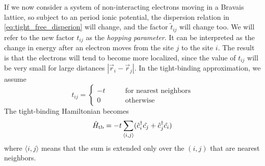 If we now consider a system of non-interacting electrons moving in a Bravais lattice, so subject to an period ionic potential, the dispersion relation in \cref{eq:tight_free_disperion} will change, and the factor $\tilde{t}_{ij}$ will change too. We will refer to the new factor $t_{ij}$ as the \emph{hopping parameter}. It can be interpreted as the change in energy after an electron moves from the site $j$ to the site $i$. The result is that the electrons will tend to become more localized, since the value of $t_{ij}$ will be very small for large distances $|\vec{r}_i - \vec{r}_j|$. In the tight-binding approximation, we assume
\begin{equation}
    t_{ij} =
    \begin{cases}
        -t \qquad                                     & \text{for nearest neighbors} \\
        0                                      \qquad & \text{otherwise}
    \end{cases}
\end{equation}
The tight-binding Hamiltonian becomes
\begin{equation} \label{eq:tight_hamiltonian_position}
    \hat{H}_\text{tb} = -t \sum_{\langle i,j \rangle} (\hat{c}^\dagger_i\hat{c_j} +  \hat{c}^\dagger_j\hat{c_i})
\end{equation}
where ${\langle i,j \rangle}$ means that the sum is extended only over the $(i,j)$ that are nearest neighbors.

